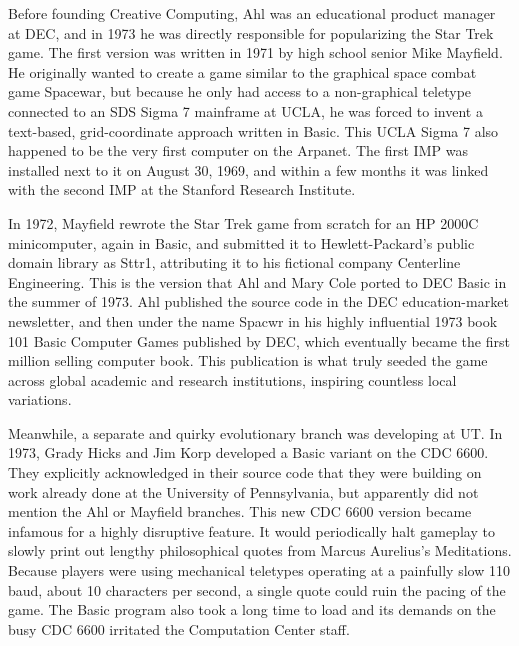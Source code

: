 Before founding Creative Computing, Ahl was an educational product manager at DEC, and in 1973 he was directly responsible for popularizing the Star Trek game. The first version was written in 1971 by high school senior Mike Mayfield. He originally wanted to create a game similar to the graphical space combat game Spacewar, but because he only had access to a non-graphical teletype connected to an SDS Sigma 7 mainframe at UCLA, he was forced to invent a text-based, grid-coordinate approach written in Basic. This UCLA Sigma 7 also happened to be the very first computer on the Arpanet. The first IMP was installed next to it on August 30, 1969, and within a few months it was linked with the second IMP at the Stanford Research Institute. \cite{hafnerWhereWizardsStay2006}

In 1972, Mayfield rewrote the Star Trek game from scratch for an HP 2000C minicomputer, again in Basic, and submitted it to Hewlett-Packard's public domain library as Sttr1, attributing it to his fictional company Centerline Engineering. This is the version that Ahl and Mary Cole ported to DEC Basic in the summer of 1973. Ahl published the source code in the DEC education-market newsletter, and then under the name Spacwr in his highly influential 1973 book 101 Basic Computer Games published by DEC, which eventually became the first million selling computer book. This publication is what truly seeded the game across global academic and research institutions, inspiring countless local variations. \cite{ahl101BASICComputer1973}

Meanwhile, a separate and quirky evolutionary branch was developing at UT. In 1973, Grady Hicks and Jim Korp developed a Basic variant on the CDC 6600. They explicitly acknowledged in their source code that they were building on work already done at the University of Pennsylvania, but apparently did not mention the Ahl or Mayfield branches. This new CDC 6600 version became infamous for a highly disruptive feature. It would periodically halt gameplay to slowly print out lengthy philosophical quotes from Marcus Aurelius's Meditations. Because players were using mechanical teletypes operating at a painfully slow 110 baud, about 10 characters per second, a single quote could ruin the pacing of the game. The Basic program also took a long time to load and its demands on the busy CDC 6600 irritated the Computation Center staff. \cite{matuszekDaveMatuszekOral2026}

